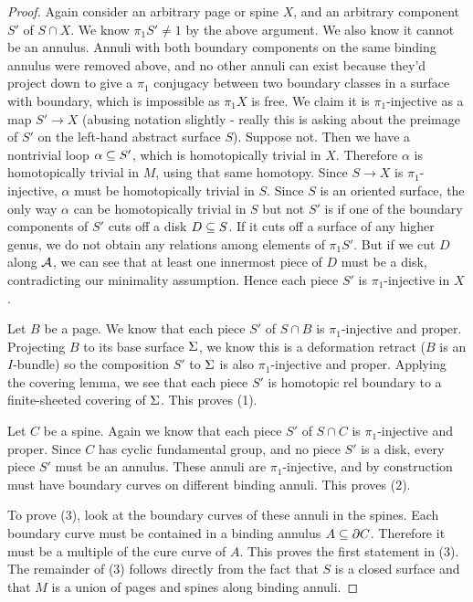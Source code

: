 \begin{proof}
Again consider an arbitrary page or spine $X$, and an arbitrary component $S'$
of $S \cap X$.  We know $\pi_1S' \neq 1$ by the above argument. We also know it
cannot be an annulus. Annuli with both boundary components on the same binding
annulus were removed above, and no other annuli can exist because they'd
project down to give a $\pi_1$ conjugacy between two boundary classes in
a surface with boundary, which is impossible as $\pi_1X$ is free. We claim it
is $\pi_1$-injective as a map $S' \to X$ (abusing notation slightly - really
this is asking about the preimage of $S'$ on the left-hand abstract surface
$S$).  Suppose not. Then we have a nontrivial loop $\alpha \subseteq S'$, which is
homotopically trivial in $X$.  Therefore $\alpha$ is homotopically trivial in
$M$, using that same homotopy.  Since $S \to X$ is $\pi_1$-injective, $\alpha$
must be homotopically trivial in $S$.  Since $S$ is an oriented surface, the
only way $\alpha$ can be homotopically trivial in $S$ but not $S'$ is if one of
the boundary components of $S'$ cuts off a disk $D \subseteq S$. If it cuts off
a surface of any higher genus, we do not obtain any relations among elements of
$\pi_1S'$.  But if we cut $D$ along $\mathcal{A}$, we can see that at least one
innermost piece of $D$ must be a disk, contradicting our minimality assumption.
Hence each piece $S'$ is $\pi_1$-injective in $X$.

Let $B$ be a page. We know that each piece $S'$ of $S \cap B$ is
$\pi_1$-injective and proper. Projecting $B$ to its base surface $\Sigma$, we know
this is a deformation retract ($B$ is an $I$-bundle) so the composition $S'$ to
$\Sigma$ is also $\pi_1$-injective and proper. Applying the covering lemma, we see
that each piece $S'$ is homotopic rel boundary to a finite-sheeted covering of
$\Sigma$.  This proves (1).

Let $C$ be a spine. Again we know that each piece $S'$ of $S \cap C$ is
$\pi_1$-injective and proper. Since $C$ has cyclic fundamental group, and no
piece $S'$ is a disk, every piece $S'$ must be an annulus. These annuli are
$\pi_1$-injective, and by construction must have boundary curves on different
binding annuli.  This proves (2).

To prove (3), look at the boundary curves of these annuli in the spines. Each
boundary curve must be contained in a binding annulus $A \subseteq \partial C$. Therefore
it must be a multiple of the cure curve of $A$. This proves the first statement
in (3). The remainder of (3) follows directly from the fact that $S$ is
a closed surface and that $M$ is a union of pages and spines along binding
annuli.

\end{proof}

